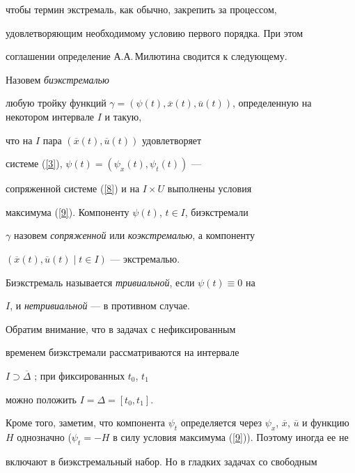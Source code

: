 чтобы термин экстремаль, как обычно, закрепить за процессом,


удовлетворяющим необходимому условию первого порядка. При этом


соглашении определение А.А.\,Милютина сводится к следующему.





\begin{defn}


Назовем {\em биэкстремалью}


любую тройку функций $\gamma =(\psi (t),\overline{x}(t),


\overline{u}(t))$, определенную на некотором интервале $I$ и такую,


что на $I$ пара $(\overline{x}(t), \overline{u}(t))$ удовлетворяет


системе (\ref{3}), $\psi (t)=(\psi_{x}(t), \psi_{t}(t))$ ---


сопряженной системе (\ref{8}) и на $I\times U$ выполнены условия


максимума (\ref{9}). Компоненту $\psi (t)$, $t\in I$, биэкстремали


$\gamma $ назовем {\em сопряженной} или {\em коэкстремалью}, а компоненту


$(\overline{x}(t), \overline{u}(t)\mid t\in I)$ --- экстремалью.


Биэкстремаль называется {\em тривиальной}, если $\psi (t)\equiv 0$ на


$I$, и {\em нетривиальной} --- в противном случае.


\end{defn}





Обратим внимание, что в задачах с нефиксированным


временем биэкстремали рассматриваются на интервале


$I\supset\overline{\Delta}$ \cite{11}; при фиксированных $t_0$, $t_1$


можно положить $I=\Delta =[t_0, t_1 ]$.





Кроме того, заметим, что компонента $\psi_t$ определяется через $\psi


_x$, $\overline{x}$, $\overline{u}$ и функцию $H$ однозначно ($\psi


_t =-H$ в силу условия максимума (\ref{9})). Поэтому иногда ее не


включают в биэкстремальный набор. Но в гладких задачах со свободным


